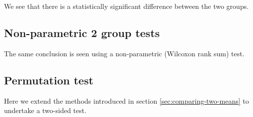 We see that there is a statistically significant difference between the two groups.


\subsection{Non-parametric 2 group tests}

The same conclusion is seen using a non-parametric (Wilcoxon rank sum) test.

\begin{knitrout}
\end{knitrout}



\subsection{Permutation test}

Here we extend the methods introduced in section \ref{sec:comparing-two-means} to 
undertake a two-sided test.

